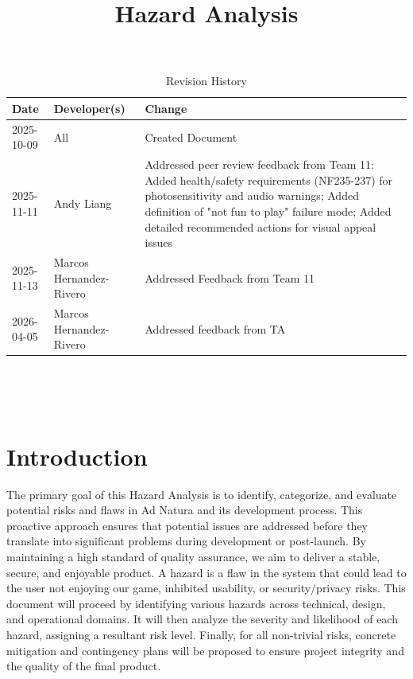 \documentclass{article}
\title{Hazard Analysis\\\progname}
\author{\authname}
\date{}
\begin{document}
\maketitle
\thispagestyle{empty}
\begin{table}[hp]
\caption{Revision History} \label{TblRevisionHistory}
\begin{tabularx}{\textwidth}{llX}
\toprule
\textbf{Date} & \textbf{Developer(s)} & \textbf{Change}\\
\midrule
2025-10-09 & All & Created Document\\
2025-11-11 & Andy Liang & Addressed peer review feedback from Team 11: Added health/safety requirements (NF235-237) for photosensitivity and audio warnings; Added definition of "not fun to play" failure mode; Added detailed recommended actions for visual appeal issues\\
2025-11-13 & Marcos Hernandez-Rivero & Addressed Feedback from Team 11\\
2026-04-05 & Marcos Hernandez-Rivero & Addressed feedback from TA\\
\bottomrule
\end{tabularx}
\end{table}

~\newpage
\tableofcontents
~\newpage
\listoftables
\listoffigures
~\newpage

\section{Introduction}

The primary goal of this Hazard Analysis is to identify, categorize, and evaluate potential risks and flaws in Ad Natura and its development process. This proactive approach ensures that potential issues are addressed before they translate into significant problems during development or post-launch. By maintaining a high standard of quality assurance, we aim to deliver a stable, secure, and enjoyable product. A hazard is a flaw in the system that could lead to the user not enjoying our game, inhibited usability, or security/privacy risks. This document will proceed by identifying various hazards across technical, design, and operational domains. It will then analyze the severity and likelihood of each hazard, assigning a resultant risk level. Finally, for all non-trivial risks, concrete mitigation and contingency plans will be proposed to ensure project integrity and the quality of the final product.\\
\end{document}
